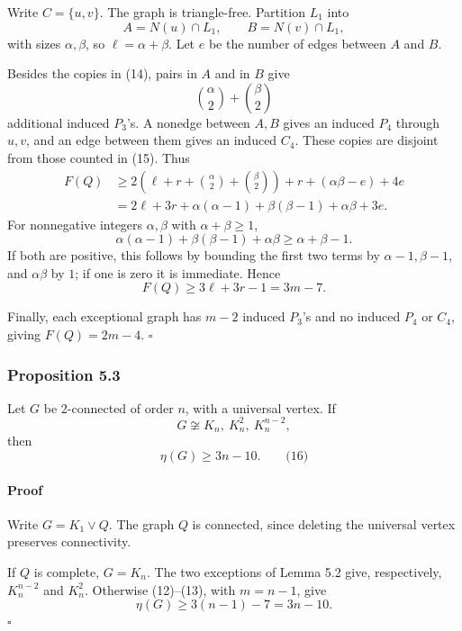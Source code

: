 \documentclass[
  11pt,
  a4paper,
]{article}
\newcounter{none} %
\begin{document}
Write \(C=\{u,v\}\). The graph is triangle-free. Partition \(L_1\) into
\[
A=N(u)\cap L_1,\qquad B=N(v)\cap L_1,
\] with sizes \(\alpha,\beta\), so \(\ell=\alpha+\beta\). Let \(e\) be
the number of edges between \(A\) and \(B\).

Besides the copies in (14), pairs in \(A\) and in \(B\) give \[
\binom{\alpha}{2}+\binom{\beta}{2}
\] additional induced \(P_3\)'s. A nonedge between \(A,B\) gives an
induced \(P_4\) through \(u,v\), and an edge between them gives an
induced \(C_4\). These copies are disjoint from those counted in (15).
Thus \begin{equation*}
\begin{aligned}
F(Q)
&\ge
2\left(\ell+r+\binom{\alpha}{2}+\binom{\beta}{2}\right)
+r+(\alpha\beta-e)+4e\\
&=
2\ell+3r+
\alpha(\alpha-1)+\beta(\beta-1)+\alpha\beta+3e.
\end{aligned}
\end{equation*} For nonnegative integers \(\alpha,\beta\) with
\(\alpha+\beta\ge1\), \[
\alpha(\alpha-1)+\beta(\beta-1)+\alpha\beta
\ge\alpha+\beta-1.
\] If both are positive, this follows by bounding the first two terms by
\(\alpha-1,\beta-1\), and \(\alpha\beta\) by \(1\); if one is zero it is
immediate. Hence \[
F(Q)\ge3\ell+3r-1=3m-7.
\]

Finally, each exceptional graph has \(m-2\) induced \(P_3\)'s and no
induced \(P_4\) or \(C_4\), giving \(F(Q)=2m-4\). \(\square\)

\subsubsection{Proposition 5.3}\label{proposition-5.3}

Let \(G\) be 2-connected of order \(n\), with a universal vertex. If \[
G\not\cong K_n,\ K_n^2,\ K_n^{n-2},
\] then \[
\boxed{\eta(G)\ge3n-10.}
\qquad\text{(16)}
\]

\paragraph{Proof}\label{proof-7}

Write \(G=K_1\vee Q\). The graph \(Q\) is connected, since deleting the
universal vertex preserves connectivity.

If \(Q\) is complete, \(G=K_n\). The two exceptions of Lemma 5.2 give,
respectively, \(K_n^{n-2}\) and \(K_n^2\). Otherwise (12)--(13), with
\(m=n-1\), give \[
\eta(G)\ge3(n-1)-7=3n-10.
\] \(\square\)
\end{document}

